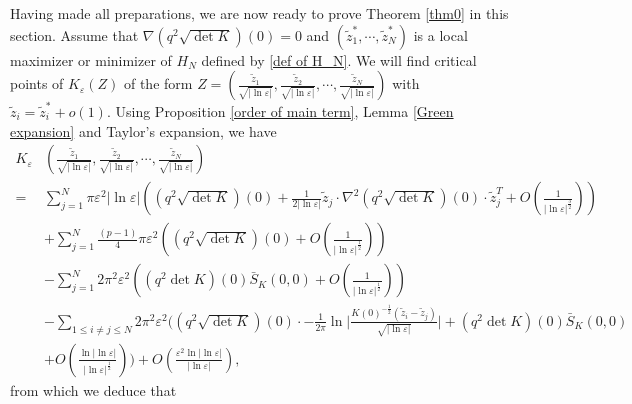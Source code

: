 \documentclass[12pt,reqno]{amsart}
\numberwithin{equation}{section}
\theoremstyle{definition}
\theoremstyle{remark}
\begin{document}
Having made all preparations, we are now ready to prove Theorem \ref{thm0} in this section. Assume that  $ \nabla \left (q^2\sqrt{\det K}\right )(0)=0 $ and $ \left( \tilde{z}_1^*,\cdots, \tilde{z}_N^*\right)  $ is a local maximizer or minimizer of $ H_N $ defined by \eqref{def of H_N}. We will find critical points of $ K_\varepsilon(Z) $  of the form $ Z=\left (\frac{\tilde{z}_1}{\sqrt{|\ln\varepsilon|}},\frac{\tilde{z}_2}{\sqrt{|\ln\varepsilon|}},\cdots,\frac{\tilde{z}_N}{\sqrt{|\ln\varepsilon|}}\right ) $ with $ \tilde{z}_i=\tilde{z}_i^*+o(1) $. Using Proposition \ref{order of main term}, Lemma \ref{Green expansion} and Taylor's expansion, we have
\begin{equation*}\label{601}
\begin{split}
K_\varepsilon&\left (\frac{\tilde{z}_1}{\sqrt{|\ln\varepsilon|}},\frac{\tilde{z}_2}{\sqrt{|\ln\varepsilon|}},\cdots,\frac{\tilde{z}_N}{\sqrt{|\ln\varepsilon|}}\right )\\
=&\sum_{j=1}^N\pi\varepsilon^2|\ln\varepsilon|\left(\left( q^2\sqrt{\det K}\right)(0)+ \frac{1}{2|\ln\varepsilon|}\tilde{z}_j\cdot \nabla^2\left(q^2\sqrt{\det K} \right)(0 )\cdot\tilde{z}_j^T+O\left( \frac{1}{|\ln\varepsilon|^{\frac{3}{2}}}\right)    \right) \\
&+\sum_{j=1}^N\frac{(p-1)}{4}\pi\varepsilon^2\left( \left( q^2\sqrt{\det K}\right) (0)+O\left( \frac{1}{|\ln\varepsilon|^{\frac{1}{2}}}\right) \right) \\
&-\sum_{j=1}^N2\pi^2\varepsilon^2 \left( \left( q^2  \det K\right)(0) \bar{S}_K(0,0)+O\left( \frac{1}{|\ln\varepsilon|^{\frac{1}{2}}}\right)\right) \\
&-\sum_{1\leq i\neq j\leq N}2\pi^2\varepsilon^2\bigg( \left( q^2  \sqrt{\det K}\right)(0)\cdot-\frac{1}{2\pi}\ln\bigg|\frac{K(0)^{-\frac{1}{2}}\left( \tilde{z}_i-\tilde{z}_j\right) }{\sqrt{|\ln\varepsilon|}}\bigg|+\left( q^2  \det K\right)(0) \bar{S}_K(0,0)\\
&+O\left( \frac{\ln|\ln\varepsilon|}{|\ln\varepsilon|^{\frac{1}{2}}}\right)\bigg) +O\left( \frac{\varepsilon^2\ln|\ln\varepsilon|}{|\ln\varepsilon|}\right),
\end{split}
\end{equation*}
from which we deduce that
\end{document}
